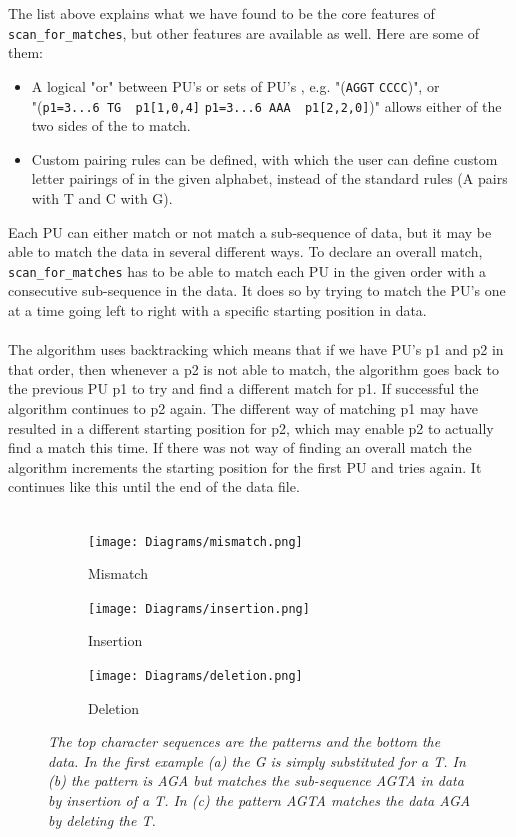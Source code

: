 \documentclass[12pt]{article}
\newcommand{\scm}{\texttt{scan\_for\_matches} }
\newcommand{\pu}{PU }
\newcommand{\pus}{PU's }
\begin{document}
The list above explains what we have found to be the core features of \texttt{scan\_for\_matches}, 
but other features are available as well. Here are some of them: 
\begin{itemize}
\item A logical "or" between \pus or sets of \pus, e.g. "(\texttt{AGGT} \text{\textbar} \texttt{CCCC})", or  \\
"(\texttt{p1=3...6 TG ~p1[1,0,4]} \text{\textbar} \texttt{p1=3...6 AAA ~p1[2,2,0]})"
allows either of the two sides of the \text{\textbar} to match.
\item Custom pairing rules can be defined, with which the user can define custom letter pairings of in the given
alphabet, instead of the standard rules (A pairs with T and C with G). \\
\end{itemize}
Each \pu can either match or not match a sub-sequence of data, but it may be able to match the data in several different ways.
To declare an overall match, \scm has to be able to match each \pu in the given order with a consecutive sub-sequence in the
data. It does so by trying to match the \pus one at a time going left to right with a specific starting position in data. \\ \\
The algorithm uses backtracking which means that if we have \pus p1 and p2 in that order, then whenever 
a p2 is not able to match, the algorithm goes back to the
previous \pu p1 to try and find a different match for p1. If successful the algorithm continues to p2 again. The
different way of matching p1 may have resulted in a different starting position for p2, which may enable p2 to 
actually find a match this time. If there was not way of finding an overall match the algorithm increments the starting
position for the first \pu and tries again. It continues like this until the end of the data file. \\ \\
\begin{figure}[H]
\centering
\begin{subfigure}[b]{0.2 \textwidth}
\texttt{[image: Diagrams/mismatch.png]}
\caption{Mismatch}
\end{subfigure}
\hspace{12mm}
\begin{subfigure}[b]{0.2 \textwidth}
\texttt{[image: Diagrams/insertion.png]}
\caption{Insertion}
\end{subfigure}
\hspace{12mm}
\begin{subfigure}[b]{0.2 \textwidth}
\texttt{[image: Diagrams/deletion.png]}
\caption{Deletion}
\end{subfigure}
\caption{\textit{The top character sequences are the patterns and the bottom the data. In the first example (a) the G is simply
substituted for a T. In (b) the pattern is AGA but matches the sub-sequence AGTA in data by insertion of a
T. In (c) the pattern AGTA matches the data AGA by deleting the T.}}
\end{figure}
\end{document}
